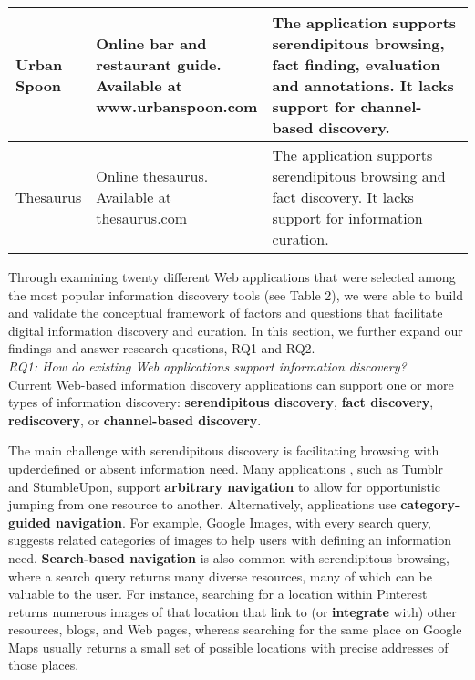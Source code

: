 \documentclass{casconpaper}
\begin{document}
{{\begin{table*}[htbp]
\begin{tabular}{|p{0.11\linewidth}| p{0.22\linewidth}| p{0.67\linewidth}|}
\hline
Urban Spoon     & \raggedright Online bar and restaurant guide. Available at www.urbanspoon.com             & The application supports serendipitous browsing, fact finding, evaluation and annotations. It lacks support for channel-based discovery.  \\
\hline
Thesaurus       & \raggedright Online thesaurus. Available at thesaurus.com                                 & The application supports serendipitous browsing and fact discovery. It lacks support for information curation.                                                                                \\
\hline
\end{tabular}
\end{table*}

Through examining twenty different Web applications that were selected among the most popular information discovery tools (see Table 2), we were able to build and validate the conceptual framework of factors and questions that facilitate digital information discovery and curation. In this section, we further expand our findings and answer research questions, RQ1 and RQ2. \\

\emph{RQ1: How do existing Web applications support information discovery?} \\

Current Web-based information discovery applications can support one or more types of information discovery: \textbf{serendipitous discovery}, \textbf{fact discovery}, \textbf{rediscovery}, or \textbf{channel-based discovery}.

The main challenge with serendipitous discovery is facilitating browsing with upderdefined or absent information need. Many applications , such as Tumblr and StumbleUpon, support \textbf{arbitrary navigation} to allow for opportunistic jumping from one resource to another.  Alternatively, applications use \textbf{category-guided navigation}. For example, Google Images, with every search query, suggests related categories of images to help users with defining an information need. \textbf{Search-based navigation} is also common with serendipitous browsing, where a search query returns many diverse resources, many of which can be valuable to the user. For instance, searching for a location within Pinterest returns numerous images of that location that link to (or \textbf{integrate} with) other resources, blogs, and Web pages, whereas searching for the same place on Google Maps usually returns a small set of possible locations with precise addresses of those places. 

}}
\end{document}
